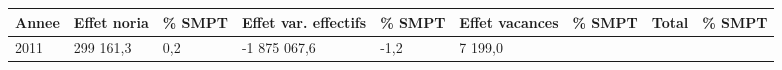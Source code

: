 \begin{longtable}[]{@{}lllllllll@{}}
\toprule
\begin{minipage}[b]{0.05\columnwidth}\raggedright
Annee\strut
\end{minipage} & \begin{minipage}[b]{0.10\columnwidth}\raggedright
Effet noria\strut
\end{minipage} & \begin{minipage}[b]{0.06\columnwidth}\raggedright
\% SMPT\strut
\end{minipage} & \begin{minipage}[b]{0.16\columnwidth}\raggedright
Effet var. effectifs\strut
\end{minipage} & \begin{minipage}[b]{0.06\columnwidth}\raggedright
\% SMPT\strut
\end{minipage} & \begin{minipage}[b]{0.12\columnwidth}\raggedright
Effet vacances\strut
\end{minipage} & \begin{minipage}[b]{0.06\columnwidth}\raggedright
\% SMPT\strut
\end{minipage} & \begin{minipage}[b]{0.10\columnwidth}\raggedright
Total\strut
\end{minipage} & \begin{minipage}[b]{0.06\columnwidth}\raggedright
\% SMPT\strut
\end{minipage}\tabularnewline
\midrule
\endhead
\begin{minipage}[t]{0.05\columnwidth}\raggedright
2011\strut
\end{minipage} & \begin{minipage}[t]{0.10\columnwidth}\raggedright
299 161,3\strut
\end{minipage} & \begin{minipage}[t]{0.06\columnwidth}\raggedright
0,2\strut
\end{minipage} & \begin{minipage}[t]{0.16\columnwidth}\raggedright
-1 875 067,6\strut
\end{minipage} & \begin{minipage}[t]{0.06\columnwidth}\raggedright
-1,2\strut
\end{minipage} & \begin{minipage}[t]{0.12\columnwidth}\raggedright
7 199,0\strut
\end{minipage} & \begin{minipage}[t]{0.06\columnwidth}\raggedright

\end{minipage}
\end{longtable}
